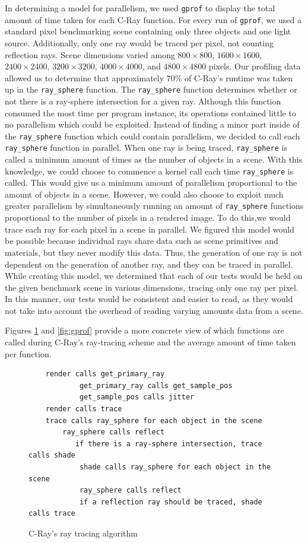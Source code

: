 \documentclass[12pt]{article}
\begin{document}
In determining a model for parallelism, we used \texttt{gprof} to display the total amount of time taken for each C-Ray function. For every run of \texttt{gprof}, we used a standard pixel benchmarking scene containing only three objects and one light source. Additionally, only one ray would be traced per pixel, not counting reflection rays. Scene dimensions varied among $800\times 800$, $1600 \times 1600$, $2400 \times 2400$, $3200 \times 3200$, $4000 \times 4000$, and $4800 \times 4800$ pixels. Our profiling data allowed us to determine that approximately 70\% of C-Ray's runtime was taken up in the \texttt{ray\_sphere} function. The \texttt{ray\_sphere} function determines whether or not there is a ray-sphere intersection for a given ray. Although this function consumed the most time per program instance, its operations contained little to no parallelism which could be exploited. Instead of finding a minor part inside of the \texttt{ray\_sphere} function which could contain parallelism, we decided to call each \texttt{ray\_sphere} function in parallel. When one ray is being traced, \texttt{ray\_sphere} is called a minimum amount of times as the number of objects in a scene. With this knowledge, we could choose to commence a kernel call each time \texttt{ray\_sphere} is called. This would give us a minimum amount of parallelism proportional to the amount of objects in a scene. However, we could also choose to exploit much greater parallelism by simultaneously running an amount of \texttt{ray\_sphere} functions proportional to the number of pixels in a rendered image. To do this,we would trace each ray for each pixel in a scene in parallel. We figured this model would be possible because individual rays share data such as scene primitives and materials, but they never modify this data. Thus, the generation of one ray is not dependent on the generation of another ray, and they can be traced in parallel. While creating this model, we determined that each of our tests would be held on the given benchmark scene in various dimensions, tracing only one ray per pixel. In this manner, our tests would be consistent and easier to read, as they would not take into account the overhead of reading varying amounts data from a scene.

Figures \ref{code:c-ray} and \ref{fig:gprof} provide a more concrete view of which functions are called during C-Ray's ray-tracing scheme and the average amount of time taken per function.

\begin{figure}
    \caption{C-Ray's ray tracing algorithm} \label{code:c-ray}
    \begin{lstlisting}
    render calls get_primary_ray
            get_primary_ray calls get_sample_pos
            get_sample_pos calls jitter
    render calls trace
    trace calls ray_sphere for each object in the scene
        ray_sphere calls reflect
           if there is a ray-sphere intersection, trace calls shade
            shade calls ray_sphere for each object in the scene
            ray_sphere calls reflect
            if a reflection ray should be traced, shade calls trace
    \end{lstlisting}
\end{figure}
\end{document}
